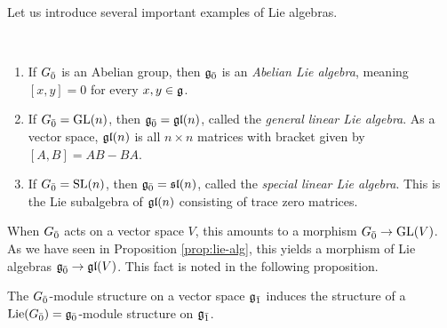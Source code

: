 Let us introduce several important examples of Lie algebras. 

\begin{example}~
  \begin{enumerate}
  \item If ${G}_{\bar{0}}$ is an Abelian group, then ${\mathfrak{g}}_{\bar{0}}$ is an \emph{Abelian Lie algebra}, meaning $[x,y] = 0$ for every $x,y \in \mathfrak{g}$.
  \item If ${G}_{\bar{0}} = \operatorname{GL}(n)$, then ${\mathfrak{g}}_{\bar{0}} = \mathfrak{gl}(n)$, called the \emph{general linear Lie algebra}. As a vector space, $\mathfrak{gl}(n)$ is all $n \times n$ matrices with bracket given by $[A,B] = AB - BA$.
  \item If ${G}_{\bar{0}} = \operatorname{SL}(n)$, then ${\mathfrak{g}}_{\bar{0}} = \mathfrak{sl}(n)$, called the \emph{special linear Lie algebra}. This is the Lie subalgebra of $\mathfrak{gl}(n)$ consisting of trace zero matrices.
  \end{enumerate}
\end{example}

When ${G}_{\bar{0}}$ acts on a vector space $V$, this amounts to a morphism ${G}_{\bar{0}} \to \operatorname{GL}(V)$. As we have seen in Proposition \ref{prop:lie-alg}, this yields a morphism of Lie algebras ${\mathfrak{g}}_{\bar{0}} \to \mathfrak{gl}(V)$. This fact is noted in the following proposition.

\begin{proposition}
  The ${G}_{\bar{0}}$-module structure on a vector space ${\mathfrak{g}}_{\bar{1}}$ induces the structure of a $\operatorname{Lie}({G}_{\bar{0}}) = {\mathfrak{g}}_{\bar{0}}$-module structure on ${\mathfrak{g}}_{\bar{1}}$.
\end{proposition}

